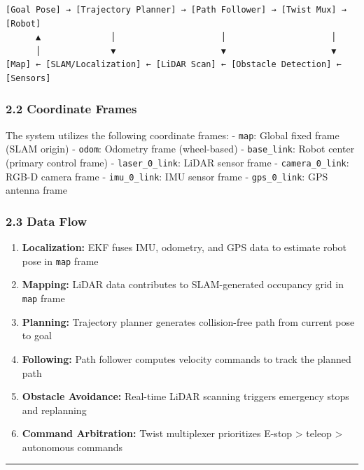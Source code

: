 \begin{verbatim}
[Goal Pose] → [Trajectory Planner] → [Path Follower] → [Twist Mux] → [Robot]
      ▲              │                     │                     │
      │              ▼                     ▼                     ▼
[Map] ← [SLAM/Localization] ← [LiDAR Scan] ← [Obstacle Detection] ← [Sensors]
\end{verbatim}

\hypertarget{coordinate-frames}{%
\subsubsection{2.2 Coordinate Frames}\label{coordinate-frames}}

The system utilizes the following coordinate frames: - \texttt{map}:
Global fixed frame (SLAM origin) - \texttt{odom}: Odometry frame
(wheel-based) - \texttt{base\_link}: Robot center (primary control
frame) - \texttt{laser\_0\_link}: LiDAR sensor frame -
\texttt{camera\_0\_link}: RGB-D camera frame - \texttt{imu\_0\_link}:
IMU sensor frame - \texttt{gps\_0\_link}: GPS antenna frame

\hypertarget{data-flow}{%
\subsubsection{2.3 Data Flow}\label{data-flow}}

\begin{enumerate}
\def\labelenumi{\arabic{enumi}.}
\tightlist
\item
  \textbf{Localization:} EKF fuses IMU, odometry, and GPS data to
  estimate robot pose in \texttt{map} frame
\item
  \textbf{Mapping:} LiDAR data contributes to SLAM-generated occupancy
  grid in \texttt{map} frame
\item
  \textbf{Planning:} Trajectory planner generates collision-free path
  from current pose to goal
\item
  \textbf{Following:} Path follower computes velocity commands to track
  the planned path
\item
  \textbf{Obstacle Avoidance:} Real-time LiDAR scanning triggers
  emergency stops and replanning
\item
  \textbf{Command Arbitration:} Twist multiplexer prioritizes E-stop
  \textgreater{} teleop \textgreater{} autonomous commands
\end{enumerate}

\begin{center}\rule{0.5\linewidth}{0.5pt}\end{center}

